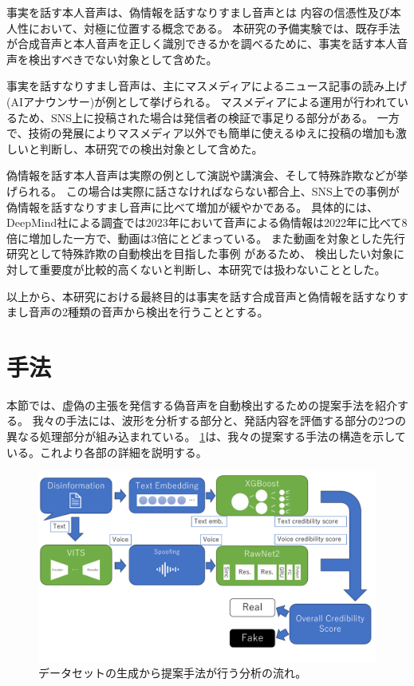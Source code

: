 事実を話す本人音声は、偽情報を話すなりすまし音声とは
内容の信憑性及び本人性において、対極に位置する概念である。
本研究の予備実験では、既存手法が合成音声と本人音声を正しく識別できるかを調べるために、事実を話す本人音声を検出すべきでない対象として含めた。

事実を話すなりすまし音声は、主にマスメディアによるニュース記事の読み上げ(AIアナウンサー)が例として挙げられる\cite{nhk2020,nhkAnnual2020}。
マスメディアによる運用が行われているため、SNS上に投稿された場合は発信者の検証で事足りる部分がある。
一方で、技術の発展によりマスメディア以外でも簡単に使えるゆえに投稿の増加も激しいと判断し、本研究での検出対象として含めた。

偽情報を話す本人音声は実際の例として演説や講演会、そして特殊詐欺などが挙げられる。
この場合は実際に話さなければならない都合上、SNS上での事例が偽情報を話すなりすまし音声に比べて増加が緩やかである。
具体的には、DeepMind社による調査では2023年において音声による偽情報は2022年に比べて8倍に増加した一方で、動画は3倍にとどまっている\cite{Ulmer_Tong_2023}。
また動画を対象とした先行研究として特殊詐欺の自動検出を目指した事例 \cite{近野恵2023}があるため、
検出したい対象に対して重要度が比較的高くないと判断し、本研究では扱わないこととした。

以上から、本研究における最終目的は事実を話す合成音声と偽情報を話すなりすまし音声の2種類の音声から検出を行うこととする。

\section{手法}\label{sec:cnt_mtd}
本節では、虚偽の主張を発信する偽音声を自動検出するための提案手法を紹介する。
我々の手法には、波形を分析する部分と、発話内容を評価する部分の2つの異なる処理部分が組み込まれている。
\cref{fig:structure}は、我々の提案する手法の構造を示している。これより各部の詳細を説明する。

\begin{figure}[h]
    \centering
    \includegraphics[width=\linewidth]{figures/Structure.pdf}
    \caption{データセットの生成から提案手法が行う分析の流れ。}
    \label{fig:structure}
\end{figure}

